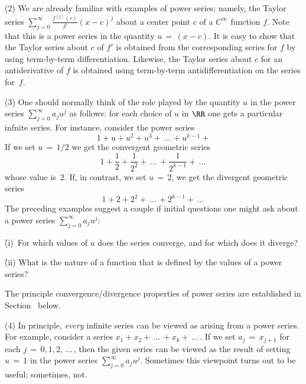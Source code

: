 \V

        (2) We are already familiar with examples of power series; namely, the Taylor series
    ${\displaystyle \sum_{j=0}^{{\infty}} \frac{f^{(j)}(c)}{j!}(x-c)^{j}}$ about a center point $c$ of a $C^{{\infty}}$ function $f$.
    Note that this is a power series in the quantity $u \,=\, (x-c)$.
    It is easy to show that the Taylor series about $c$ of $f'$ is obtained from the corresponding series for $f$ by using term-by-term differentiation.
    Likewise, the Taylor series about $c$ for an antiderivative of $f$ is obtained using term-by-term antidifferentiation on the series for~$f$.

\V

        (3) One should normally think of the role played by the quantity $u$ in the power series $\sum_{j=0}^{{\infty}} a_{j}u^{j}$ as follows:
    for each choice of $u$ in ${\RR}$ one gets a particular infnite series.
    For instance, consider the power series
        \begin{displaymath}
        1+ u + u^{2} + u^{3} + \,{\ldots}\, + u^{k-1} +
        \end{displaymath}
    If we set $u \,=\, 1/2$ we get the convergent geometric series
        \begin{displaymath}
        1 + \frac{1}{2} + \frac{1}{2^{2}} + \,{\ldots}\, + \frac{1}{2^{k-1}} + \,{\ldots}\,
        \end{displaymath}
    whose value is~$2$.
    If, in contrast, we set $u \,=\, 2$, we get the divergent geometric series
        \begin{displaymath}
        1 + 2 + 2^{2} + \,{\ldots}\, + 2^{k-1} + \,{\ldots}\,
        \end{displaymath}
    The preceding examples suggest a couple if initial questions one might ask about a power series $\sum_{j=0}^{{\infty}} a_{j}u^{j}$:

        \h (i)\, For which values of $u$ does the series converge, and for which does it diverge?

        \h (ii) What is the nature of a function that is defined by the values of a power series?

\noindent The principle convergence/divergence properties of power series are established in Section~ below.

\V

        (4) In principle, {\em every} infinite series can be viewed as arising from a power series.
    For example, consider a series $x_{1} + x_{2} + \,{\ldots}\, + x_{k} + \,{\ldots}\,$.
    If we set $a_{j} \,=\, x_{j+1}$ for each $j \,=\, 0,1,2,\,{\ldots}\,$, then the given series can be viewed as the result of setting $u \,=\, 1$ in the power series $\sum_{j=0}^{{\infty}} a_{j}u^{j}$.
    Sometimes this viewpoint turns out to be useful; sometimes, not.

